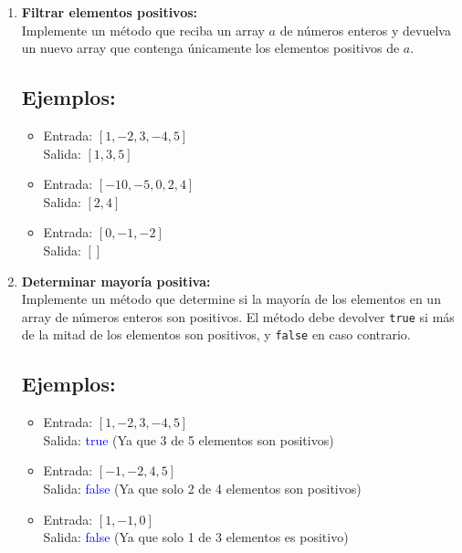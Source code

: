 \begin{enumerate}[label=\alph*)]
    \item \textbf{Filtrar elementos positivos:} \\
    Implemente un método que reciba un array \(a\) de números enteros y devuelva un nuevo array que contenga únicamente los elementos positivos de \(a\).

    \subsection*{Ejemplos:}
    \begin{itemize}
        \item Entrada: \([1, -2, 3, -4, 5]\) \\
        Salida: \([1, 3, 5]\)
        \item Entrada: \([-10, -5, 0, 2, 4]\) \\
        Salida: \([2, 4]\)
        \item Entrada: \([0, -1, -2]\) \\
        Salida: \([]\)
    \end{itemize}

    \item \textbf{Determinar mayoría positiva:} \\
    Implemente un método que determine si la mayoría de los elementos en un array de números enteros son positivos. El método debe devolver \texttt{true} si más de la mitad de los elementos son positivos, y \texttt{false} en caso contrario.

    \subsection*{Ejemplos:}
    \begin{itemize}
        \item Entrada: \([1, -2, 3, -4, 5]\) \\
        Salida: \textcolor{blue}{true}  (Ya que 3 de 5 elementos son positivos)
        \item Entrada: \([-1, -2, 4, 5]\) \\
        Salida: \textcolor{blue}{false}  (Ya que solo 2 de 4 elementos son positivos)
        \item Entrada: \([1, -1, 0]\) \\
        Salida: \textcolor{blue}{false}  (Ya que solo 1 de 3 elementos es positivo)
    \end{itemize}
\end{enumerate}
